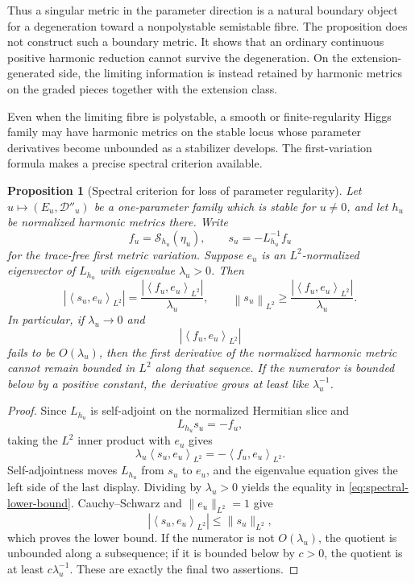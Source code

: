 \documentclass[11pt,reqno]{amsart}
\newtheorem{proposition}[theorem]{Proposition}
\theoremstyle{definition}
\theoremstyle{remark}
\newcommand{\cD}{\mathcal D}
\newcommand{\cS}{\mathcal S}
\newcommand{\ip}[2]{\left\langle #1,#2\right\rangle}
\newcommand{\norm}[1]{\left\lVert #1\right\rVert}
\newcommand{\abs}[1]{\left\lvert #1\right\rvert}
\begin{document}
Thus a singular metric in the parameter direction is a natural boundary object for a degeneration toward a nonpolystable semistable fibre.  The proposition does not construct such a boundary metric.  It shows that an ordinary continuous positive harmonic reduction cannot survive the degeneration.  On the extension-generated side, the limiting information is instead retained by harmonic metrics on the graded pieces together with the extension class.

Even when the limiting fibre is polystable, a smooth or finite-regularity Higgs family may have harmonic metrics on the stable locus whose parameter derivatives become unbounded as a stabilizer develops.  The first-variation formula makes a precise spectral criterion available.

\begin{proposition}[Spectral criterion for loss of parameter regularity]\label{prop:spectral-parameter-singularity}
Let $u\mapsto(E_u,\cD''_u)$ be a one-parameter family which is stable for $u\neq0$, and let $h_u$ be normalized harmonic metrics there.  Write
\[
  f_u=\cS_{h_u}(\eta_u),
  \qquad
  s_u=-L_{h_u}^{-1}f_u
\]
for the trace-free first metric variation.  Suppose $e_u$ is an $L^2$-normalized eigenvector of $L_{h_u}$ with eigenvalue $\lambda_u>0$.  Then
\begin{equation}\label{eq:spectral-lower-bound}
  \abs{\ip{s_u}{e_u}_{L^2}}
  =\frac{\abs{\ip{f_u}{e_u}_{L^2}}}{\lambda_u},
  \qquad
  \norm{s_u}_{L^2}
  \ge
  \frac{\abs{\ip{f_u}{e_u}_{L^2}}}{\lambda_u}.
\end{equation}
In particular, if $\lambda_u\to0$ and
\[
  \abs{\ip{f_u}{e_u}_{L^2}}
\]
fails to be $O(\lambda_u)$, then the first derivative of the normalized harmonic metric cannot remain bounded in $L^2$ along that sequence.  If the numerator is bounded below by a positive constant, the derivative grows at least like $\lambda_u^{-1}$.
\end{proposition}

\begin{proof}
Since $L_{h_u}$ is self-adjoint on the normalized Hermitian slice and
\[
  L_{h_u}s_u=-f_u,
\]
taking the $L^2$ inner product with $e_u$ gives
\[
  \lambda_u\ip{s_u}{e_u}_{L^2}
  =-\ip{f_u}{e_u}_{L^2}.
\]
Self-adjointness moves $L_{h_u}$ from $s_u$ to $e_u$, and the eigenvalue
equation gives the left side of the last display.  Dividing by
$\lambda_u>0$ yields the equality in
\eqref{eq:spectral-lower-bound}.  Cauchy--Schwarz and
$\|e_u\|_{L^2}=1$ give
\[
  |\ip{s_u}{e_u}_{L^2}|\le\|s_u\|_{L^2},
\]
which proves the lower bound.  If the numerator is not
$O(\lambda_u)$, the quotient is unbounded along a subsequence; if it is
bounded below by $c>0$, the quotient is at least
$c\lambda_u^{-1}$.  These are exactly the final two assertions.
\end{proof}
\end{document}
